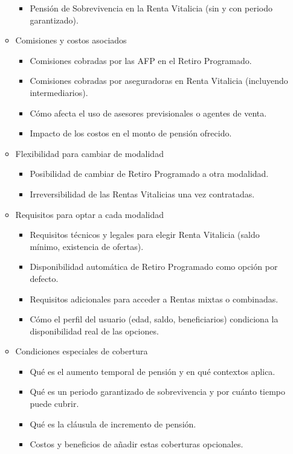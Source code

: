 \begin{enumerate}
\begin{itemize}
\begin{itemize}
        \item Pensión de Sobrevivencia en la Renta Vitalicia (sin y con periodo garantizado).
    \end{itemize}
    \item Comisiones y costos asociados
    \begin{itemize}
        \item Comisiones cobradas por las AFP en el Retiro Programado.
        \item Comisiones cobradas por aseguradoras en Renta Vitalicia (incluyendo intermediarios).
        \item Cómo afecta el uso de asesores previsionales o agentes de venta.
        \item Impacto de los costos en el monto de pensión ofrecido.
    \end{itemize}
    \item Flexibilidad para cambiar de modalidad
    \begin{itemize}
        \item Posibilidad de cambiar de Retiro Programado a otra modalidad.
        \item Irreversibilidad de las Rentas Vitalicias una vez contratadas.
    \end{itemize}
    \item Requisitos para optar a cada modalidad
    \begin{itemize}
        \item Requisitos técnicos y legales para elegir Renta Vitalicia (saldo mínimo, existencia de ofertas).
        \item Disponibilidad automática de Retiro Programado como opción por defecto.
        \item Requisitos adicionales para acceder a Rentas mixtas o combinadas.
        \item Cómo el perfil del usuario (edad, saldo, beneficiarios) condiciona la disponibilidad real de las opciones.
    \end{itemize}
    \item Condiciones especiales de cobertura
    \begin{itemize}
        \item Qué es el aumento temporal de pensión y en qué contextos aplica.
        \item Qué es un periodo garantizado de sobrevivencia y por cuánto tiempo puede cubrir.
        \item Qué es la cláusula de incremento de pensión.
        \item Costos y beneficios de añadir estas coberturas opcionales.

\end{itemize}
\end{itemize}
\end{enumerate}
